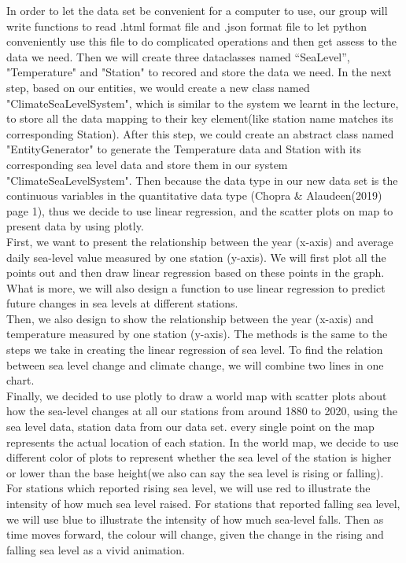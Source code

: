 \documentclass[fontsize=11pt]{article}
\begin{document}
    In order to let the data set be convenient for a computer to use, our group will write functions to read .html format file and .json format file to let python conveniently use this file to do complicated operations and then get assess to the data we need. Then we will create three dataclasses named “SeaLevel”, "Temperature" and "Station" to recored and store the data we need. In the next step, based on our entities, we would create a new class named "ClimateSeaLevelSystem", which is similar to the system we learnt in the lecture, to store all the data mapping to their key element(like station name matches its corresponding Station). After this step, we could create an abstract class named "EntityGenerator" to generate the Temperature data and Station with its corresponding sea level data and store them in our system "ClimateSeaLevelSystem". Then because the data type in our new data set is the continuous variables in the quantitative data type (Chopra \& Alaudeen(2019) page 1), thus we decide to use linear regression, and the scatter plots on map to present data by using plotly.\\
    First, we want to present the relationship between the year (x-axis) and average daily sea-level value measured by one station (y-axis). We will first plot all the points out and then draw linear regression based on these points in the graph. What is more, we will also design a function to use linear regression to predict future changes in sea levels at different stations. \\
    Then, we also design to show the relationship between the year (x-axis) and temperature measured by one station (y-axis). The methods is the same to the steps we take in creating the linear regression of sea level. To find the relation between sea level change and climate change, we will combine two lines in one chart. \\
    Finally, we decided to use plotly to draw a world map with scatter plots about how the sea-level changes at all our stations from around 1880 to 2020, using the sea level data, station data from our data set. every single point on the map represents the actual location of each station. In the world map, we decide to use different color of plots to represent whether the sea level of the station is higher or lower than the base height(we also can say the sea level is rising or falling). For stations which reported rising sea level, we will use red to illustrate the intensity of how much sea level raised. For stations that reported falling sea level, we will use blue to illustrate the intensity of how much sea-level falls. Then as time moves forward, the colour will change, given the change in the rising and falling sea level as a vivid animation.\\
\end{document}
